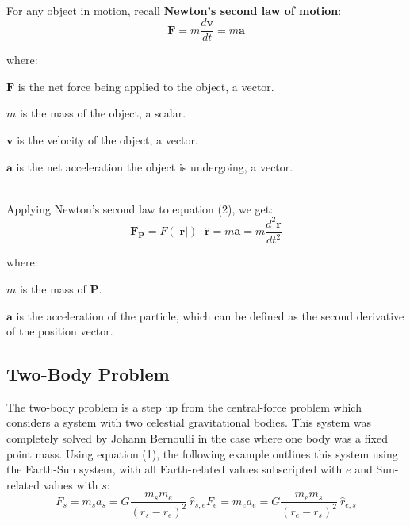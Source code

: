 \documentclass[12pt]{article}
\begin{document}
\begin{spacing}{1.25}
{    \hfill \\
    \noindent For any object in motion, recall \textbf{Newton's second law of motion}:
    \begin{equation*}
        \mathbf{F} = m\frac{d\mathbf{v}}{dt} = m\mathbf{a}
    \end{equation*}

    \noindent where:
    \begin{slist} 
        \item \(\mathbf{F}\) is the net force being applied to the object, a vector.
        \item \(m\) is the mass of the object, a scalar.
        \item \(\mathbf{v}\) is the velocity of the object, a vector.
        \item \(\mathbf{a}\) is the net acceleration the object is undergoing, a vector.
    \end{slist}
    
    \hfill \\
    \noindent Applying Newton's second law to equation (2), we get:
    \begin{equation}
        \mathbf{F}_\mathbf{P} = F(|\mathbf{r}|) \cdot \mathbf{\hat{r}} = m\mathbf{a} = m\frac{d^2\mathbf{r}}{dt^2}
    \end{equation}

    \noindent where:
    \begin{slist}
        \item \(m\) is the mass of \(\mathbf{P}\).
        \item \(\mathbf{a}\) is the acceleration of the particle, which can be defined as the second derivative of the position vector.
    \end{slist}
}


\subsection{Two-Body Problem}
\par {
    The two-body problem is a step up from the central-force problem which considers a system with two celestial gravitational bodies. This system was completely solved by Johann Bernoulli in the case where one body was a fixed point mass. Using equation (1), the following example outlines this system using the Earth-Sun system, with all Earth-related values subscripted with \(e\) and Sun-related values with \(s\):
    \begin{subequations}
        \begin{equation}
            F_s = m_s a_s = G\frac{m_sm_e}{(r_s - r_e)^2} \: \hat{r}_{s,e}
        \end{equation}
        \begin{equation}
            F_e = m_e a_e = G\frac{m_em_s}{(r_e - r_s)^2} \: \hat{r}_{e,s}
        \end{equation}
    \end{subequations}
}


\end{spacing}
\end{document}
